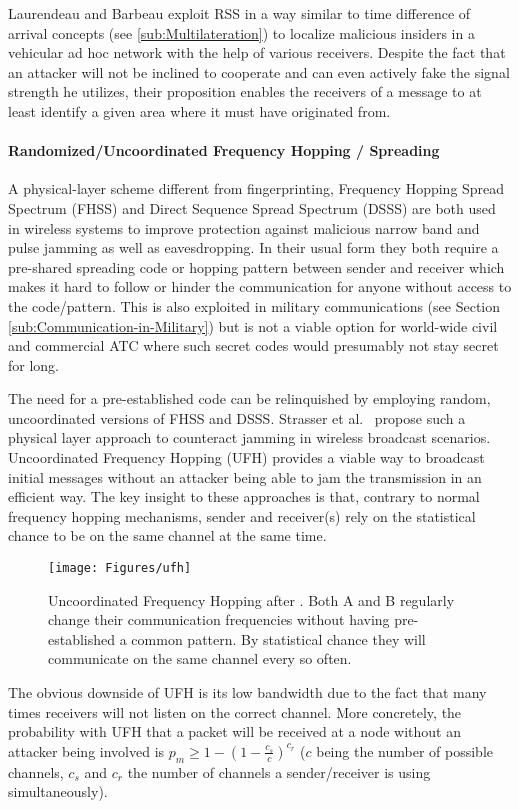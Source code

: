 \documentclass[english]{IEEEtran}
\begin{document}
Laurendeau and Barbeau \cite{Laurendeau2008,Laurendeau2009} exploit
RSS in a way similar to time difference of arrival concepts (see \ref{sub:Multilateration})
to localize malicious insiders in a vehicular ad hoc network with
the help of various receivers. Despite the fact that an attacker will
not be inclined to cooperate and can even actively fake the signal
strength he utilizes, their proposition enables the receivers of a
message to at least identify a given area where it must have originated
from.\\



\paragraph{Randomized/Uncoordinated Frequency Hopping / Spreading}

A physical-layer scheme different from fingerprinting, Frequency Hopping
Spread Spectrum (FHSS) and Direct Sequence Spread Spectrum (DSSS)
are both used in wireless systems to improve protection against malicious
narrow band and pulse jamming as well as eavesdropping. In their usual
form they both require a pre-shared spreading code or hopping pattern
between sender and receiver which makes it hard to follow or hinder
the communication for anyone without access to the code/pattern. This
is also exploited in military communications (see Section \ref{sub:Communication-in-Military})
but is not a viable option for world-wide civil and commercial ATC
where such secret codes would presumably not stay secret for long.

The need for a pre-established code can be relinquished by employing
random, uncoordinated versions of FHSS and DSSS. Strasser et al.~\cite{Strasser2008}
propose such a physical layer approach to counteract jamming in wireless
broadcast scenarios. Uncoordinated Frequency Hopping (UFH) provides
a viable way to broadcast initial messages without an attacker being
able to jam the transmission in an efficient way. The key insight
to these approaches is that, contrary to normal frequency hopping
mechanisms, sender and receiver(s) rely on the statistical chance
to be on the same channel at the same time. 
\begin{figure}
\texttt{[image: Figures/ufh]}

\caption{Uncoordinated Frequency Hopping after \cite{Strasser2008}. Both A
and B regularly change their communication frequencies without having
pre-established a common pattern. By statistical chance they will
communicate on the same channel every so often. }


\end{figure}
The obvious downside of UFH is its low bandwidth due to the fact that
many times receivers will not listen on the correct channel. More
concretely, the probability with UFH that a packet will be received
at a node without an attacker being involved is $p_{m}\geq1-(1-\frac{c_{s}}{c})^{c_{r}}$
($c$ being the number of possible channels, $c_{s}$ and $c_{r}$
the number of channels a sender/receiver is using simultaneously).
\end{document}
